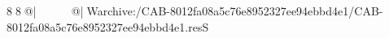 8  8  @|                                                   @| W   archive:/CAB-8012fa08a5c76e8952327ee94ebbd4e1/CAB-8012fa08a5c76e8952327ee94ebbd4e1.resS 